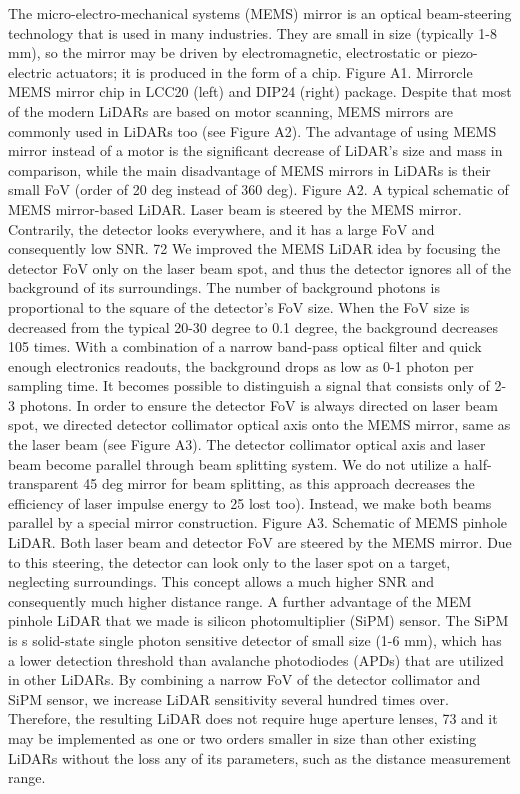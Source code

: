The micro-electro-mechanical systems (MEMS) mirror is an optical beam-steering technology that is
used in many industries. They are small in size (typically 1-8 mm), so the mirror may be driven by
electromagnetic, electrostatic or piezo-electric actuators; it is produced in the form of a chip.
Figure A1. Mirrorcle MEMS mirror chip in LCC20 (left) and DIP24 (right) package.
Despite that most of the modern LiDARs are based on motor scanning, MEMS mirrors are commonly
used in LiDARs too (see Figure A2). The advantage of using MEMS mirror instead of a motor is the
significant decrease of LiDAR’s size and mass in comparison, while the main disadvantage of MEMS
mirrors in LiDARs is their small FoV (order of 20 deg instead of 360 deg).
Figure A2. A typical schematic of MEMS mirror-based LiDAR. Laser beam is steered by the MEMS
mirror. Contrarily, the detector looks everywhere, and it has a large FoV and consequently low
SNR.
72
We improved the MEMS LiDAR idea by focusing the detector FoV only on the laser beam spot, and
thus the detector ignores all of the background of its surroundings. The number of background
photons is proportional to the square of the detector’s FoV size. When the FoV size is decreased
from the typical 20-30 degree to 0.1 degree, the background decreases ~ 105 times. With a
combination of a narrow band-pass optical filter and quick enough electronics readouts, the
background drops as low as 0-1 photon per sampling time. It becomes possible to distinguish a signal
that consists only of 2-3 photons.
In order to ensure the detector FoV is always directed on laser beam spot, we directed detector
collimator optical axis onto the MEMS mirror, same as the laser beam (see Figure A3). The detector
collimator optical axis and laser beam become parallel through beam splitting system. We do not
utilize a half-transparent 45 deg mirror for beam splitting, as this approach decreases the efficiency of
laser impulse energy to 25%
lost too). Instead, we make both beams parallel by a special mirror construction.
Figure A3. Schematic of MEMS pinhole LiDAR. Both laser beam and detector FoV are steered by
the MEMS mirror. Due to this steering, the detector can look only to the laser spot on a target,
neglecting surroundings. This concept allows a much higher SNR and consequently much higher
distance range.
A further advantage of the MEM pinhole LiDAR that we made is silicon photomultiplier (SiPM)
sensor. The SiPM is s solid-state single photon sensitive detector of small size (1-6 mm), which has a
lower detection threshold than avalanche photodiodes (APDs) that are utilized in other LiDARs. By
combining a narrow FoV of the detector collimator and SiPM sensor, we increase LiDAR sensitivity
several hundred times over. Therefore, the resulting LiDAR does not require huge aperture lenses,
73
and it may be implemented as one or two orders smaller in size than other existing LiDARs without
the loss any of its parameters, such as the distance measurement range.




